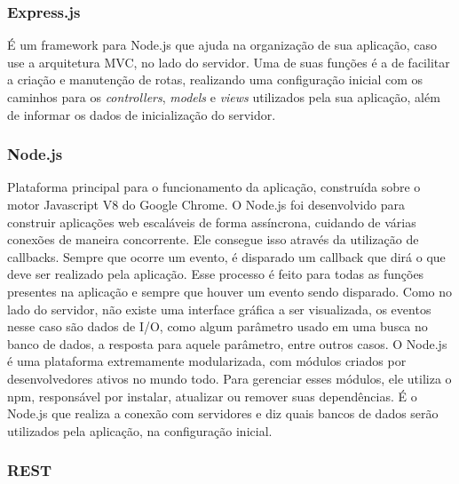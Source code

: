 \documentclass[
	12pt,				%
	oneside,			%
	a4paper,			%
	brazil				%
]{abntex2}
\begin{document}
{\subsubsection{Express.js}

É um framework para Node.js que ajuda na organização de sua aplicação, caso use a arquitetura MVC, no lado do servidor. Uma de suas funções é a de facilitar a criação e manutenção de rotas, realizando uma configuração inicial com os caminhos para os \textit{controllers}, \textit{models} e \textit{views} utilizados pela sua aplicação, além de informar os dados de inicialização do servidor.


\subsubsection{Node.js}

Plataforma principal para o funcionamento da aplicação, construída sobre o motor Javascript V8 do Google Chrome.
O Node.js foi desenvolvido para construir aplicações web escaláveis de forma assíncrona, cuidando de várias conexões de maneira concorrente. Ele consegue isso através da utilização de callbacks. 
Sempre que ocorre um evento, é disparado um callback que dirá o que deve ser realizado pela aplicação. Esse processo é feito para todas as funções presentes na aplicação e sempre que houver um evento sendo disparado.
Como no lado do servidor, não existe uma interface gráfica a ser visualizada, os eventos nesse caso são dados de I/O, como algum parâmetro usado em uma busca no banco de dados, a resposta para aquele parâmetro, entre outros casos.
O Node.js é uma plataforma extremamente modularizada, com módulos criados por desenvolvedores ativos no mundo todo.
Para gerenciar esses módulos, ele utiliza o npm, responsável por instalar, atualizar ou remover suas dependências. 
É o Node.js que realiza a conexão com servidores e diz quais bancos de dados serão utilizados pela aplicação, na configuração inicial.


\subsubsection{REST}

}
\end{document}
